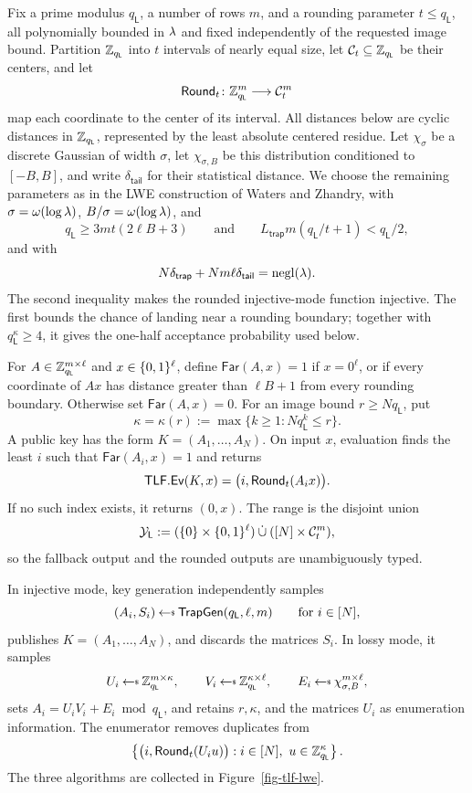 Fix a prime modulus $q_{\mathsf L}$, a number of rows $m$, and a rounding
parameter $t\le q_{\mathsf L}$, all polynomially bounded in $\lambda$ and fixed
independently of the requested image bound. Partition $\mathbb Z_{q_{\mathsf L}}$
into $t$ intervals of nearly equal size, let
$\mathcal{C}_t\subseteq\mathbb Z_{q_{\mathsf L}}$ be their centers, and let
$$
\mathsf{Round}_t\colon\mathbb Z_{q_{\mathsf L}}^m\longrightarrow\mathcal{C}_t^m
$$
map each coordinate to the center of its interval. All distances below are
cyclic distances in $\mathbb Z_{q_{\mathsf L}}$, represented by the least absolute
centered residue. Let $\chi_\sigma$ be a discrete Gaussian of width $\sigma$, let
$\chi_{\sigma,B}$ be this distribution conditioned to $[-B,B]$, and write
$\delta_{\mathsf{tail}}$ for their statistical distance. We choose the
remaining parameters as in the LWE construction of Waters and Zhandry, with
$\sigma=\omega(\log\lambda)$, $B/\sigma=\omega(\log\lambda)$, and
$$
q_{\mathsf L}\ge3mt(2\ell B+3)
\qquad\text{and}\qquad
L_{\mathsf{trap}}m(q_{\mathsf L}/t+1)<q_{\mathsf L}/2,
$$
and with
$$
N\delta_{\mathsf{trap}}+Nm\ell\delta_{\mathsf{tail}}=\mathrm{negl}(\lambda).
$$
The second inequality makes the rounded injective-mode function injective.
The first bounds the chance of landing near a rounding boundary; together
with $q_{\mathsf L}^\kappa\ge4$, it gives the one-half acceptance probability
used below.

For $A\in\mathbb Z_{q_{\mathsf L}}^{m\times\ell}$ and $x\in\{0,1\}^\ell$, define
$\mathsf{Far}(A,x)=1$ if $x=0^\ell$, or if every coordinate of $Ax$ has
distance greater than $\ell B+1$ from every rounding boundary. Otherwise set
$\mathsf{Far}(A,x)=0$. For an image bound $r\ge Nq_{\mathsf L}$, put
$$
\kappa=\kappa(r):=\max\{k\ge1:Nq_{\mathsf L}^k\le r\}.
$$
A public key has the form $K=(A_1,\ldots,A_N)$. On input $x$, evaluation
finds the least $i$ such that $\mathsf{Far}(A_i,x)=1$ and returns
$$
\mathsf{TLF}.\mathsf{Ev}(K,x)=\bigl(i,\mathsf{Round}_t(A_ix)\bigr).
$$
If no such index exists, it returns $(0,x)$.
The range is the disjoint union
$$
\mathcal{Y}_{\mathsf L}
:=
(\{0\}\times\{0,1\}^\ell)
\mathbin{\dot\cup}
([N]\times\mathcal{C}_t^m),
$$
so the fallback output and the rounded outputs are unambiguously typed.

In injective mode, key generation independently samples
$$
(A_i,S_i)\getsr\mathsf{TrapGen}(q_{\mathsf L},\ell,m)
\qquad\text{for }i\in[N],
$$
publishes $K=(A_1,\ldots,A_N)$, and discards the matrices $S_i$. In lossy
mode, it samples
$$
U_i\getsr\Z_{q_{\mathsf L}}^{m\times\kappa},\qquad
V_i\getsr\Z_{q_{\mathsf L}}^{\kappa\times\ell},\qquad
E_i\getsr\chi_{\sigma,B}^{m\times\ell},
$$
sets $A_i=U_iV_i+E_i\bmod q_{\mathsf L}$, and retains $r,\kappa$, and the
matrices $U_i$ as enumeration information. The enumerator removes duplicates
from
$$
\left\{
\bigl(i,\mathsf{Round}_t(U_i u)\bigr):
i\in[N],\ u\in\mathbb Z_{q_{\mathsf L}}^\kappa
\right\}.
$$
The three algorithms are collected in Figure~\ref{fig-tlf-lwe}.

